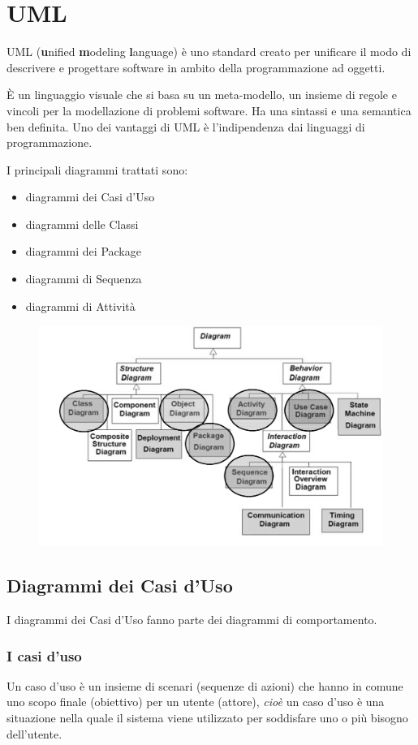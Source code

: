 \chapter{UML}
UML (\textbf{u}nified \textbf{m}odeling \textbf{l}anguage) è uno standard creato per unificare il modo di descrivere e progettare software in ambito della programmazione ad oggetti. 

\`E un linguaggio visuale che si basa su un meta-modello, un insieme di regole e vincoli per la modellazione di problemi software.
Ha una sintassi e una semantica ben definita. Uno dei vantaggi di UML è l'indipendenza dai linguaggi di programmazione.

I principali diagrammi trattati sono:
\begin{itemize}
\item diagrammi dei Casi d'Uso
\item diagrammi delle Classi
\item diagrammi dei Package
\item diagrammi di Sequenza
\item diagrammi di Attività
\end{itemize} 

\begin{figure}[H]
    \includegraphics[width=1\textwidth]{res/img/diagrammiUML}
\end{figure}

\section{Diagrammi dei Casi d'Uso}

I diagrammi dei Casi d'Uso fanno parte dei diagrammi di comportamento. 

\subsection{I casi d'uso}
Un caso d'uso è un insieme di scenari (sequenze di azioni) che hanno in comune uno scopo finale (obiettivo) per un utente (attore),
\textit{cioè} un caso d'uso è una situazione nella quale il sistema viene utilizzato per soddisfare uno o più bisogno dell'utente.

